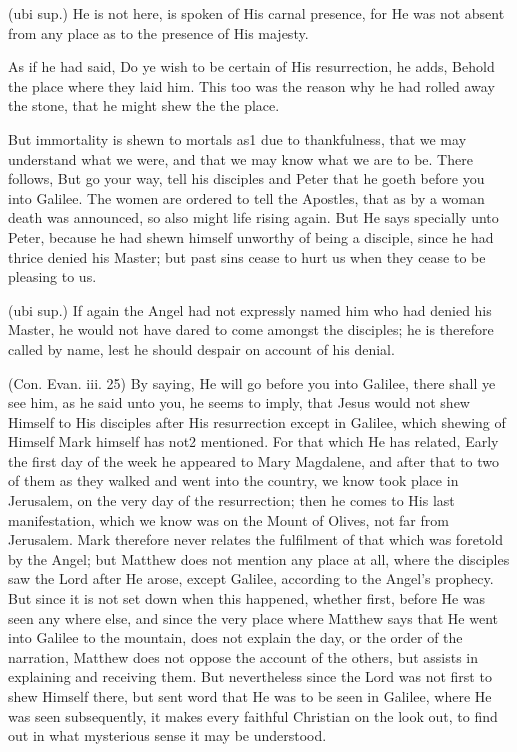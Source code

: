  (ubi sup.) He is not here, is spoken of His carnal presence, for He was not absent from any place as to the presence of His majesty.

 As if he had said, Do ye wish to be certain of His resurrection, he adds, Behold the place where they laid him. This too was the reason why he had rolled away the stone, that he might shew the the place.

 But immortality is shewn to mortals as1 due to thankfulness, that we may understand what we were, and that we may know what we are to be. There follows, But go your way, tell his disciples and Peter that he goeth before you into Galilee. The women are ordered to tell the Apostles, that as by a woman death was announced, so also might life rising again. But He says specially unto Peter, because he had shewn himself unworthy of being a disciple, since he had thrice denied his Master; but past sins cease to hurt us when they cease to be pleasing to us.

 (ubi sup.) If again the Angel had not expressly named him who had denied his Master, he would not have dared to come amongst the disciples; he is therefore called by name, lest he should despair on account of his denial.

 (Con. Evan. iii. 25) By saying, He will go before you into Galilee, there shall ye see him, as he said unto you, he seems to imply, that Jesus would not shew Himself to His disciples after His resurrection except in Galilee, which shewing of Himself Mark himself has not2 mentioned. For that which He has related, Early the first day of the week he appeared to Mary Magdalene, and after that to two of them as they walked and went into the country, we know took place in Jerusalem, on the very day of the resurrection; then he comes to His last manifestation, which we know was on the Mount of Olives, not far from Jerusalem. Mark therefore never relates the fulfilment of that which was foretold by the Angel; but Matthew does not mention any place at all, where the disciples saw the Lord after He arose, except Galilee, according to the Angel’s prophecy. But since it is not set down when this happened, whether first, before He was seen any where else, and since the very place where Matthew says that He went into Galilee to the mountain, does not explain the day, or the order of the narration, Matthew does not oppose the account of the others, but assists in explaining and receiving them. But nevertheless since the Lord was not first to shew Himself there, but sent word that He was to be seen in Galilee, where He was seen subsequently, it makes every faithful Christian on the look out, to find out in what mysterious sense it may be understood.

